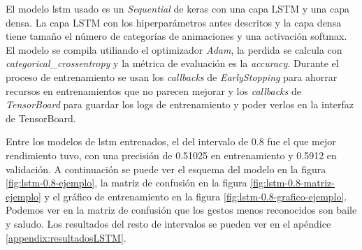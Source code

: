 El modelo \gls{lstm} usado es un \textit{Sequential} de keras con una capa LSTM y una capa densa. La capa LSTM con los hiperparámetros antes descritos y la capa densa tiene tamaño el número de categorías de animaciones y una activación softmax. El modelo se compila utiliando el optimizador \textit{Adam}, la perdida se calcula con \textit{categorical\_crossentropy} y la métrica de evaluación es la \textit{accuracy}. Durante el proceso de entrenamiento se usan los \textit{callbacks} de \textit{EarlyStopping} para ahorrar recursos en entrenamientos que no parecen mejorar y los \textit{callbacks} de \textit{TensorBoard} para guardar los logs de entrenamiento y poder verlos en la interfaz de TensorBoard.

Entre los modelos de \gls{lstm} entrenados, el del intervalo de 0.8 fue el que mejor rendimiento tuvo, con una precisión de 0.51025 en entrenamiento y 0.5912 en validación. A continuación se puede ver el esquema del modelo en la figura \ref{fig:lstm-0.8-ejemplo}, la matriz de confusión en la figura \ref{fig:lstm-0.8-matriz-ejemplo} y el gráfico de entrenamiento en la figura \ref{fig:lstm-0.8-grafico-ejemplo}. Podemos ver en la matriz de confusión que los gestos menos reconocidos son baile y saludo. Los resultados del resto de intervalos se pueden ver en el apéndice \ref{appendix:resultadosLSTM}.

